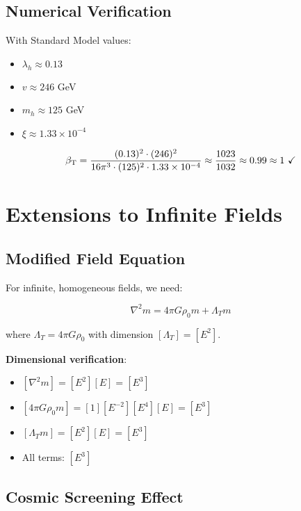 \documentclass[12pt,a4paper]{article}
\newcommand{\betaT}{\beta_{\text{T}}}
\begin{document}
	\subsection{Numerical Verification}
	\label{subsec:numerical_verification}
	
	With Standard Model values:
	\begin{itemize}
		\item $\lambda_h \approx 0.13$
		\item $v \approx 246$ GeV
		\item $m_h \approx 125$ GeV
		\item $\xi \approx 1.33 \times 10^{-4}$
	\end{itemize}
	
	\begin{equation}
		\betaT = \frac{(0.13)^2 \cdot (246)^2}{16\pi^3 \cdot (125)^2 \cdot 1.33 \times 10^{-4}} \approx \frac{1023}{1032} \approx 0.99 \approx 1 \text{ \checkmark}
	\end{equation}
	
	\section{Extensions to Infinite Fields}
	\label{sec:infinite_fields}
	
	\subsection{Modified Field Equation}
	\label{subsec:modified_field_equation}
	
	For infinite, homogeneous fields, we need:
	
	\begin{equation}
		\label{eq:infinite_field_equation}
		\nabla^2 m = 4\pi G \rho_0 m + \Lambda_T m
	\end{equation}
	
	where $\Lambda_T = 4\pi G \rho_0$ with dimension $[\Lambda_T] = [E^2]$.
	
	\textbf{Dimensional verification}:
	\begin{itemize}
		\item $[\nabla^2 m] = [E^2][E] = [E^3]$
		\item $[4\pi G \rho_0 m] = [1][E^{-2}][E^4][E] = [E^3]$
		\item $[\Lambda_T m] = [E^2][E] = [E^3]$
		\item All terms: $[E^3]$ \checkmark
	\end{itemize}
	
	\subsection{Cosmic Screening Effect}
	\label{subsec:cosmic_screening}
	
\end{document}
